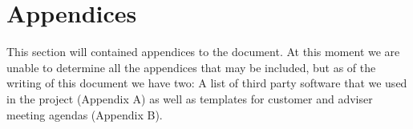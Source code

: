 \documentclass[../document.tex]{subfiles}
\begin{document}
\section*{Appendices}

This section will contained appendices to the document. At this moment we are unable to determine all the appendices that may be included, but as of the writing of this document we have two: A list of third party software that we used in the project (Appendix A) as well as templates for customer and adviser meeting agendas (Appendix B).
\end{document}
